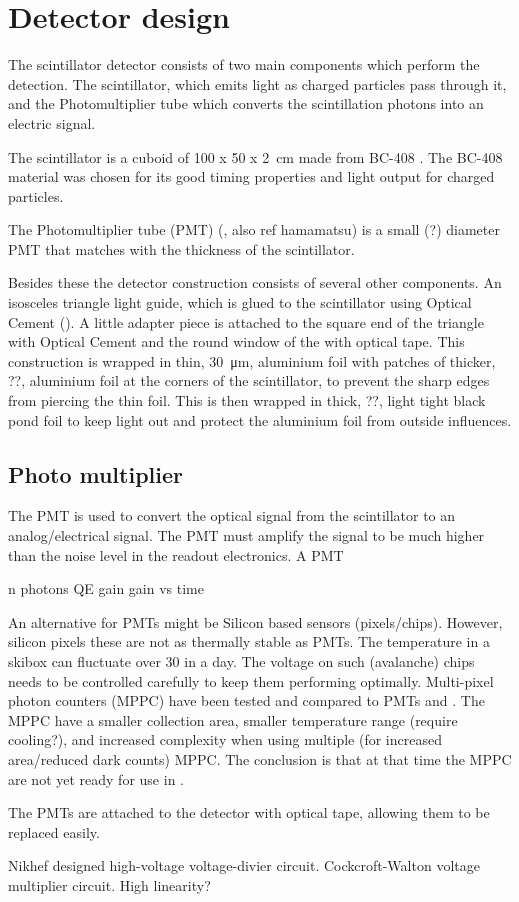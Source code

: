 \section{Detector design}

The scintillator detector consists of two main components which perform the
detection. The scintillator, which emits light as charged particles pass
through it, and the Photomultiplier tube which converts the scintillation
photons into an electric signal.

The scintillator is a cuboid of \SI[product-units=power]{100 x 50 x
2}{\centi\meter} made from BC-408 \cite{bc408}. The BC-408 material was
chosen for its good timing properties and light output for charged particles.

The Photomultiplier tube (PMT) (\cite{et:pmt}, also ref hamamatsu) is a small
(?) diameter PMT that matches with the thickness of the scintillator.

Besides these the detector construction consists of several other components.
An isosceles triangle light guide, which is glued to the scintillator using
Optical Cement (\cite{bc600}). A little adapter piece is attached to the square
end of the triangle with Optical Cement and the round window of the \pmt with
optical tape. This construction is wrapped in thin, \SI{30}{\micro\meter},
aluminium foil with patches of thicker, ??, aluminium foil at the corners of
the scintillator, to prevent the sharp edges from piercing the thin foil. This
is then wrapped in thick, ??, light tight black pond foil to keep light out and
protect the aluminium foil from outside influences.


\subsection{Photo multiplier}

The PMT is used to convert the optical signal from the scintillator to an analog/electrical signal. The PMT must amplify the signal to be much higher than the noise level in the readout electronics. A PMT 

n photons
QE
gain
gain vs time

An alternative for PMTs might be Silicon based sensors (pixels/chips). However, silicon pixels these are not as thermally stable as PMTs. The temperature in a \hisparc skibox can fluctuate over \SI{30}{\celcius} in a day. The voltage on such (avalanche) chips needs to be controlled carefully to keep them performing optimally. Multi-pixel photon counters (MPPC) have been tested and compared to PMTs \cite[Chapter~3.4]{lio2011} and \cite[Chapter~3.6]{lio2010}. The MPPC have a smaller collection area, smaller temperature range (require cooling?), and increased complexity when using multiple (for increased area/reduced dark counts) MPPC. The conclusion is that at that time the MPPC are not yet ready for use in \hisparc.

The PMTs are attached to the detector with optical tape, allowing them to be replaced easily.

Nikhef designed high-voltage voltage-divier circuit.
Cockcroft-Walton voltage multiplier circuit.
High linearity?

